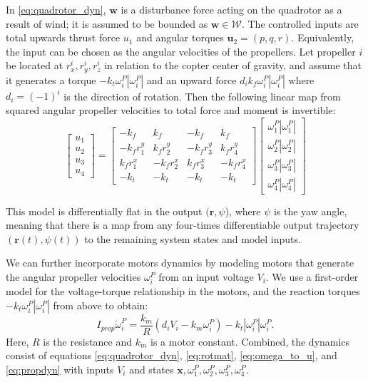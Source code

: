 \documentclass[conference]{IEEEtran}
\begin{document}
In \eqref{eq:quadrotor_dyn}, $\mathbf{w}$ is a disturbance force acting on the quadrotor as a result of wind; it is assumed to be bounded as $\mathbf{w} \in \mathcal W$. The controlled inputs are total upwards thrust force $u_1$ and angular torques $\mathbf{u}_2 = (p,q,r)$. Equivalently, the input can be chosen as the angular velocities of the propellers. Let propeller $i$ be located at $r_x^i, r_y^i, r_z^i$ in relation to the copter center of gravity, and assume that it generates a torque $- k_t \omega_i^P |\omega_i^P|$ and an upward force $d_i k_f \omega_i^P |\omega_i^P|$ where $d_i = (-1)^i$ is the direction of rotation. Then the following linear map from squared angular propeller velocities to total force and moment is invertible:
\begin{equation}
\label{eq:omega_to_u}
\begin{bmatrix}
  u_1 \\
  u_2 \\
  u_3 \\
  u_4
\end{bmatrix} =
\begin{bmatrix}
  -k_f  & k_f& -k_f&  k_f \\
    -k_f r_1^y &   k_f r_2^y &  -k_f r_3^y &   k_f r_4^y \\
     k_f r_1^x &  -k_f r_2^x &   k_f r_3^x  & -k_f r_4^x \\
     -k_t  &     -k_t    &   -k_t       & -k_t
\end{bmatrix}
\begin{bmatrix}
  \omega^P_1 |\omega^P_1| \\
  \omega^P_2 |\omega^P_2| \\
  \omega^P_3 |\omega^P_3| \\
  \omega^P_4 |\omega^P_4|
\end{bmatrix}
\end{equation}

This model is differentially flat in the output $(\mathbf{r}, \psi$), where $\psi$ is the yaw angle, meaning that there is a map from any four-times differentiable output trajectory $(\mathbf{r}(t), \psi(t))$ to the remaining system states and model inputs.

We can further incorporate motors dynamics by modeling motors that generate the angular propeller velocities $\omega_i^P$ from an input voltage $V_i$. We use a first-order model for the voltage-torque relationship in the motors, and the reaction torques $-k_t \omega_i^P |\omega_i^P|$ from above to obtain:
\begin{equation}
\label{eq:propdyn}
  I_{prop} \dot \omega_i^P = \frac{k_m}{ R} \left( d_i V_i - k_m \omega_i^P \right) - k_t |\omega_i^P| \omega_i^P.
\end{equation}
Here, $R$ is the resistance and $k_m$ is a motor constant. Combined, the dynamics consist of equations \eqref{eq:quadrotor_dyn}, \eqref{eq:rotmat}, \eqref{eq:omega_to_u}, and \eqref{eq:propdyn} with inputs $V_i$ and states $\mathbf{x}, \omega_1^P, \omega_2^P, \omega_3^P, \omega_4^P$.
\end{document}
